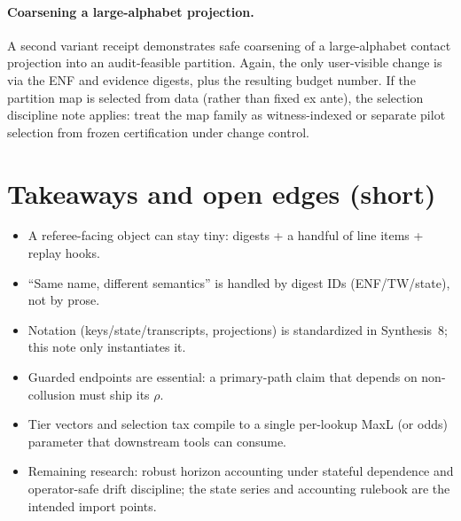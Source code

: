 \documentclass[11pt]{article}
\begin{document}
\paragraph{Coarsening a large-alphabet projection.}
A second variant receipt demonstrates safe coarsening of a large-alphabet contact projection into an audit-feasible partition.
Again, the only user-visible change is via the ENF and evidence digests, plus the resulting budget number.\cite{series:coarsening}
If the partition map is selected from data (rather than fixed ex ante), the selection discipline note applies: treat the map family as witness-indexed or separate pilot selection from frozen certification under change control.\cite{series:selectiondiscipline}

\section{Takeaways and open edges (short)}
\begin{itemize}[leftmargin=*]
\item A referee-facing object can stay tiny: digests + a handful of line items + replay hooks.
\item ``Same name, different semantics'' is handled by digest IDs (ENF/TW/state), not by prose.
\item Notation (keys/state/transcripts, projections) is standardized in Synthesis~8; this note only instantiates it.\cite{series:notation}
\item Guarded endpoints are essential: a primary-path claim that depends on non-collusion must ship its $\rho$.
\item Tier vectors and selection tax compile to a single per-lookup MaxL (or odds) parameter that downstream tools can consume.\cite{series:endpointbridge}
\item Remaining research: robust horizon accounting under stateful dependence and operator-safe drift discipline; the state series and accounting rulebook are the intended import points.\cite{series:state1,series:accountingrulebook}
\end{itemize}
\end{document}
